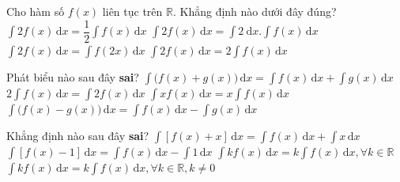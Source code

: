 \begin{ex}%
	 Cho hàm số $f(x)$ liên tục trên $\mathbb{R}$. Khẳng định nào dưới đây đúng?
	\choice 
		{$\displaystyle\int  2 f(x)\mathrm{\,d}x=\dfrac{1}{2} \displaystyle\int f(x)\mathrm{\,d}x$}
		 {$\displaystyle\int 2 f(x)\mathrm{\,d}x=\displaystyle\int 2 \mathrm{~d} x. \displaystyle\int f(x)\mathrm{\,d}x$}
		{$\displaystyle\int 2 f(x)\mathrm{\,d}x=\displaystyle\int  f(2 x)\mathrm{\,d}x$}
		{\True $\displaystyle\int 2 f(x)\mathrm{\,d}x=2 \displaystyle\int f(x)\mathrm{\,d}x$} 
\end{ex}

\begin{ex}%
	Phát biểu  nào sau đây \textbf{sai}?
	 \choice
		{$\displaystyle\int\big(f(x)+g(x)\big) \mathrm{\,d}x=\displaystyle\int f(x) \mathrm{\,d} x+\displaystyle\int  g(x) \mathrm{\,d} x$}
		{$2 \displaystyle\int f(x)  \mathrm{\,d}x=\displaystyle\int 2 f(x) \mathrm{\,d} x$}
		{\True $\displaystyle\int x f(x) \mathrm{\,d}x=x \displaystyle\int f(x) \mathrm{\,d}  x$}
		{$\displaystyle\int\big(f(x)-g(x)\big)  \mathrm{\,d}x=\displaystyle\int f(x) \mathrm{\,d} x-\displaystyle\int g(x) \mathrm{\,d} x$}
\end{ex}

\begin{ex}%
	Khẳng định nào  sau đây {\bf sai}?
	\choice 
		{$\displaystyle\int\left[f(x)+x\right]  \mathrm{\,d}x=\displaystyle\int f(x) \mathrm{\,d}x+\displaystyle\int x \mathrm{\,d} x$}
		{$\displaystyle\int\left[f(x)-1\right] \mathrm{\,d}x=\displaystyle\int f(x) \mathrm{\,d}x-\displaystyle\int  1\mathrm{\,d} x$}
		{\True $\displaystyle\int k f(x) \mathrm{\,d}x=k \displaystyle\int f(x) \mathrm{\,d}x,  \forall k \in \mathbb{R}$}
		{$\displaystyle\int k f(x) \mathrm{\,d}x=k \displaystyle\int f(x) \mathrm{\,d}x, \forall k \in \mathbb{R}, k  \neq 0$}
\end{ex}

